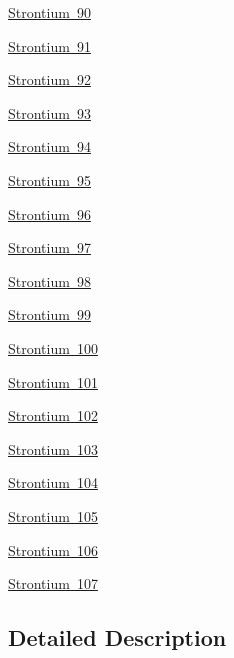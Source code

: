 \begin{DoxyCompactItemize}
\mbox{\hyperlink{group___isotope_const-_strontium-_sr90}{Strontium 90}}
\item 
\mbox{\hyperlink{group___isotope_const-_strontium-_sr91}{Strontium 91}}
\item 
\mbox{\hyperlink{group___isotope_const-_strontium-_sr92}{Strontium 92}}
\item 
\mbox{\hyperlink{group___isotope_const-_strontium-_sr93}{Strontium 93}}
\item 
\mbox{\hyperlink{group___isotope_const-_strontium-_sr94}{Strontium 94}}
\item 
\mbox{\hyperlink{group___isotope_const-_strontium-_sr95}{Strontium 95}}
\item 
\mbox{\hyperlink{group___isotope_const-_strontium-_sr96}{Strontium 96}}
\item 
\mbox{\hyperlink{group___isotope_const-_strontium-_sr97}{Strontium 97}}
\item 
\mbox{\hyperlink{group___isotope_const-_strontium-_sr98}{Strontium 98}}
\item 
\mbox{\hyperlink{group___isotope_const-_strontium-_sr99}{Strontium 99}}
\item 
\mbox{\hyperlink{group___isotope_const-_strontium-_sr100}{Strontium 100}}
\item 
\mbox{\hyperlink{group___isotope_const-_strontium-_sr101}{Strontium 101}}
\item 
\mbox{\hyperlink{group___isotope_const-_strontium-_sr102}{Strontium 102}}
\item 
\mbox{\hyperlink{group___isotope_const-_strontium-_sr103}{Strontium 103}}
\item 
\mbox{\hyperlink{group___isotope_const-_strontium-_sr104}{Strontium 104}}
\item 
\mbox{\hyperlink{group___isotope_const-_strontium-_sr105}{Strontium 105}}
\item 
\mbox{\hyperlink{group___isotope_const-_strontium-_sr106}{Strontium 106}}
\item 
\mbox{\hyperlink{group___isotope_const-_strontium-_sr107}{Strontium 107}}
\end{DoxyCompactItemize}


\subsection{Detailed Description}
